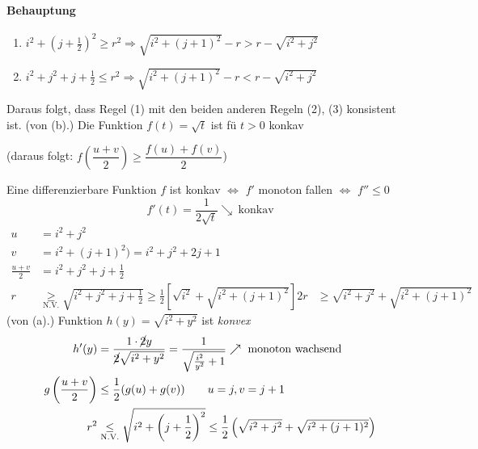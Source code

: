 	\paragraph*{Behauptung}
	\begin{enumerate}
	 \renewcommand*\theenumi{(\alph{enumi})}
	 \item $i^2 + \left(j + \frac{1}{2}\right)^2 \ge r^2 \Rightarrow \sqrt{i^2+(j+1)^2} - r > r - \sqrt{i^2+j^2}$
	 \item $i^2 + j^2 + j + \frac{1}{2} \le r^2 \Rightarrow \sqrt{i^2+(j+1)^2} - r < r - \sqrt{i^2+j^2}$
	\end{enumerate}
	Daraus folgt, dass Regel (1) mit den beiden anderen Regeln (2), (3) konsistent ist.
\Bew	(von (b).) Die Funktion $f(t) = \sqrt{t}$ ist fü $t > 0$ konkav
	\begin{center}
	 (daraus folgt: $f\left(\dfrac{u+v}{2}\right) \ge \dfrac{f(u)+f(v)}{2}$)
	\end{center}
	Eine differenzierbare Funktion $f$ ist konkav $\Leftrightarrow$ $f'$ monoton fallen $\Leftrightarrow$ $f'' \le 0$
	\[f'(t) = \frac{1}{2 \sqrt{t}} \searrow\ \text{konkav}\]
	\begin{align*}
	 u &= i^2 + j^2\\
	 v &= i^2 + (j+1)^2 ) = i^2 + j^2 + 2j + 1\\
	 \frac{u+v}{2} &= i^2 + j^2 + j + \frac{1}{2}\\
	 r &\underset{\mathrm{N.V.}}{\ge} \sqrt{i^2 + j^2 + j + \frac{1}{2}} \ge \frac{1}{2} \left[\sqrt{i^2} + \sqrt{i^2+(j+1)^2}\right]
	 2r & \ge \sqrt{i^2+j^2} + \sqrt{i^2 + (j+1)^2}
	\end{align*}
\Bew	(von (a).) Funktion $h(y) = \sqrt{i^2 + y^2}$ ist \emph{konvex}
	\begin{align*}
	 h'(y) &= \frac{1 \cdot \cancel{2} y}{\cancel{2}\sqrt{i^2+y^2}} = \frac{1}{\sqrt{\frac{i^2}{y^2}+1}}
			\nearrow\text{ monoton wachsend}\\
	 g\left(\frac{u+v}{2}\right) &\le \frac{1}{2} (g(u) + g(v)) \qquad u = j, v = j+1\\
	 r^2 &\underset{\mathrm{N.V.}}{\le} \sqrt{i^2+\left(j+\frac{1}{2}\right)^2}
		\le \frac{1}{2}\left(\sqrt{i^2+j^2}+\sqrt{i^2 + (j+1)^2}\right)
	\end{align*}

